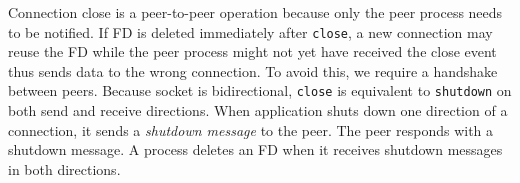 
Connection close is a peer-to-peer operation because only the peer process needs to be notified. If FD is deleted immediately after \texttt{close}, a new connection may reuse the FD while the peer process might not yet have received the close event thus sends data to the wrong connection. To avoid this, we require a handshake between peers.
Because socket is bidirectional, \texttt{close} is equivalent to \texttt{shutdown} on both send and receive directions.
When application shuts down one direction of a connection, it sends a \textit{shutdown message} to the peer. The peer responds with a shutdown message. A process deletes an FD when it receives shutdown messages in both directions.



\fi
